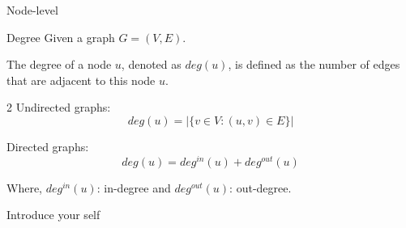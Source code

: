 \documentclass[aspectratio=169]{beamer}
\begin{document}
    \begin{frame}{Node-level}
        \begin{exampleblock}{Degree}
            Given a graph $G = (V, E)$.
            

            The degree of a node $u$, denoted as $deg(u)$, is defined as the number of edges that are adjacent to this node $u$.
        \end{exampleblock}

        \begin{multicols}{2} %
            Undirected graphs:
            \begin{equation}
                deg(u) = |\{v \in V : (u, v) \in E\}|
            \end{equation}
        
            Directed graphs:
            \begin{equation}
                deg(u) = deg^{in}(u) + deg^{out}(u)
            \end{equation}
        \end{multicols}
        
        Where, $deg^{in}(u)$: in-degree and $deg^{out}(u)$: out-degree. \newline


        \begin{note}
            {Introduce your self}
        \end{note}
    \end{frame}
\end{document}
